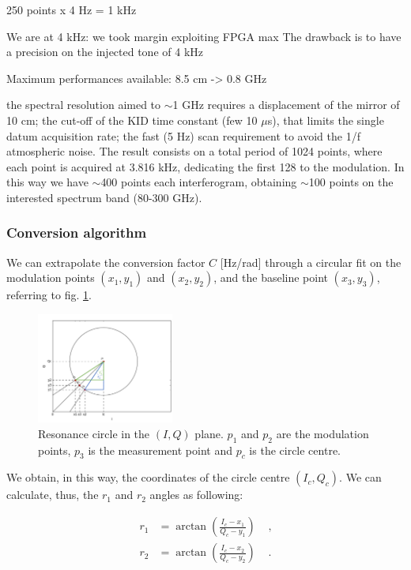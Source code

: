 \documentclass[twocolumn,traditabstract]{aa}\\
\begin{document}
250 points x 4 Hz = 1 kHz

We are at 4 kHz: we took margin exploiting FPGA max
The drawback is to have a precision on the injected tone of 4 kHz

Maximum performances available: 8.5 cm -> 0.8 GHz
\color{black}

the spectral resolution aimed to $\sim$1 GHz requires a displacement of the mirror of 10 cm; the cut-off of the KID time constant (few 10 $\mu$s), that limits the single datum acquisition rate; the fast (5 Hz) scan requirement to avoid the 1/f atmospheric noise. The result consists on a total period of 1024 points, where each point is acquired at 3.816 kHz, dedicating the first 128 to the modulation. In this way we have $\sim$400 points each interferogram, obtaining $\sim$100 points on the interested spectrum band (80-300 GHz).\\



\subsubsection{Conversion algorithm}
\label{conv}

\noindent We can extrapolate the conversion factor $C$ [Hz/rad] through a circular fit on the modulation points $(x_1,y_1)$ and $(x_2,y_2)$, and the baseline point $(x_3,y_3)$, referring to fig. \ref{fig:IQ_modulation}.

\begin{figure}[htf]
	\centering
	\includegraphics[width=0.4\textwidth]{3.acqui/circle.png}
	\caption{Resonance circle in the $(I,Q)$ plane. $p_1$ and $p_2$ are the modulation points, $p_3$ is the measurement point and $p_c$ is the circle centre. }
	\label{fig:IQ_modulation}
\end{figure}


We obtain, in this way, the coordinates of the circle centre $(I_c,Q_c)$. We can calculate, thus, the $r_1$ and $r_2$ angles as following:

\begin{equation}
\begin{align}
r_1 &= \arctan\left( \frac{I_c-x_1}{Q_c - y_1}  \right) &\text{ ,}\\
r_2 &= \arctan\left( \frac{I_c-x_2}{Q_c - y_2}  \right) &\text{ .}
\end{align}
\end{equation}
\end{document}
